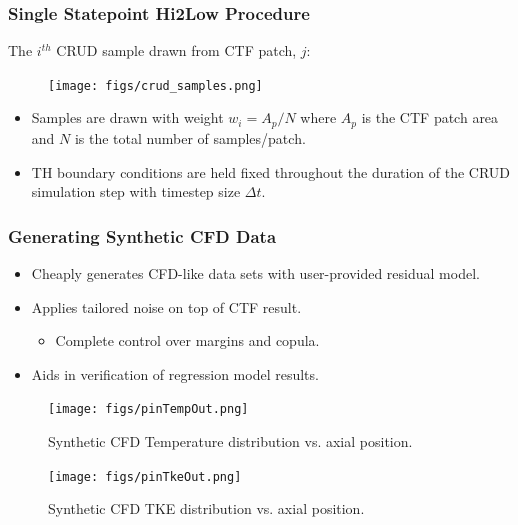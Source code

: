\documentclass[t, pdftex]{beamer}
\begin{document}
\begin{frame}
\frametitle{Single Statepoint Hi2Low Procedure}
The $i^{th}$ CRUD sample drawn from CTF patch, $j$:
\begin{figure}[!htbp]
\centering
\texttt{[image: figs/crud\_samples.png]}
\label{model_overview}
\end{figure}
\begin{itemize}
\item Samples are drawn with weight $w_i=A_p/N$ where $A_p$ is the CTF patch area and $N$ is the total number of samples/patch.
\item TH boundary conditions are held fixed throughout the duration of the CRUD simulation step with timestep size $\Delta t$.
\end{itemize}
\end{frame}

\begin{frame}[shrink=20]
\frametitle{Generating Synthetic CFD Data}
\begin{itemize}
\item Cheaply generates CFD-like data sets with user-provided residual model.
\item Applies tailored noise on top of CTF result.
\begin{itemize}
	\item Complete control over margins and copula. 
\end{itemize}
\item Aids in verification of regression model results. 
\end{itemize}
\begin{figure}
        \centering
        \begin{minipage}{.5\textwidth}
            \centering
            \texttt{[image: figs/pinTempOut.png]}
            \caption{Synthetic CFD Temperature distribution vs. axial position.}
        \end{minipage}%
        \begin{minipage}{.5\textwidth}
            \centering
            \texttt{[image: figs/pinTkeOut.png]}
            \caption{Synthetic CFD TKE distribution vs. axial position.}
        \end{minipage}
    \end{figure}
\end{frame}

\end{document}
